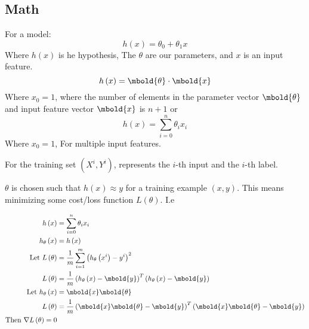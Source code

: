 \documentclass[12pt letter]{report}
\begin{document}

\subsection{Math}
For a model:
\[
  h \left( x \right)  = \theta_0 + \theta_1 x
\]
Where $h \left( x\right) $ is he hypothesis, The $\theta$ are our parameters, and $x$ is an input feature.
\[
  h \left( x \right) = \mbold{\theta} \cdot \mbold{x}
\]
Where $x_0 = 1$, where the number of elements in the parameter vector $\mbold{\theta}$ and input feature vector $\mbold{x}$ is $n+1$ or
\[
  h \left( x \right) = \displaystyle\sum_{i = 0}^{n} \theta_i x_i
\]
Where $x_0 = 1$, For multiple input features.

For the training set $ \left( X^i, Y^i\right) $, represents the $i$-th input and the  $i$-th label.



$\theta$ is chosen such that $h \left( x \right) \approx y $ for a training example $ \left( x, y\right) $. This means
minimizing some cost/loss function $L \left( \theta \right) $. I.e

\begin{align*}
  h \left( x \right)                      & = \displaystyle\sum_{i = 0}^{n} \theta_i x_i                                                          \\
  h_{\theta} \left( x \right)             & = h \left( x \right)                                                                                  \\
  \text{Let } L \left( \theta \right)     & = \frac{1}{m} \displaystyle\sum_{i = 1}^{m} \left( h_{\theta} \left( x^i \right)
  - y^i \right)^2                                                                                                                                 \\
  L \left( \theta \right)                 & = \frac{1}{m} \left( h_{\theta} \left( x \right) - \mbold{y}  \right)^{T} \left( h_{\theta} \left(
  x\right) - \mbold{y}  \right)                                                                                                                   \\
  \text{Let } h_{\theta} \left( x \right) & = \mbold{x} \mbold{\theta}                                                                            \\
  L \left( \theta \right)                 & = \frac{1}{m} \left( \mbold{x} \mbold{\theta} - \mbold{y} \right)^{T} \left( \mbold{x} \mbold{\theta}
  - \mbold{y}\right)                                                                                                                              \\
  \text{Then }
  \nabla L \left( \theta \right)  = 0
\end{align*}
\end{document}
